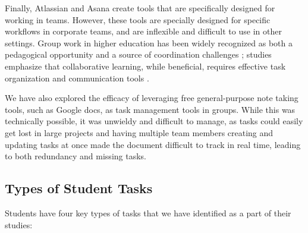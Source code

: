 \documentclass[11pt,oneside]{article}
\begin{document}
Finally, Atlassian and Asana create tools that are specifically designed for working in teams. However, these tools are specially designed for specific workflows in corporate teams, and are inflexible and difficult to use in other settings. Group work in higher education has been widely recognized as both a pedagogical opportunity and a source of coordination challenges \citep{johnson2009educational}; studies emphasize that collaborative learning, while beneficial, requires effective task organization and communication tools \citep{dunlosky2013improving}.

We have also explored the efficacy of leveraging free general-purpose note taking tools, such as Google docs, as task management tools in groups. While this was technically possible, it was unwieldy and difficult to manage, as tasks could easily get lost in large projects and having multiple team members creating and updating tasks at once made the document difficult to track in real time, leading to both redundancy and missing tasks.
\subsection{Types of Student Tasks}
Students have four key types of tasks that we have identified as a part of their studies: 
\end{document}
